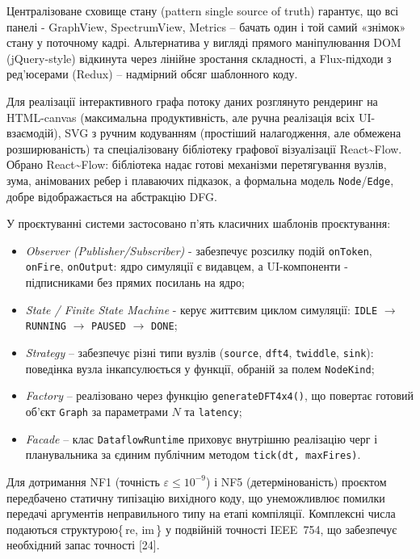 \documentclass[
]{article}
\begin{document}
Централізоване сховище стану (pattern single source of truth) гарантує,
що всі панелі - GraphView, SpectrumView, Metrics -- бачать один і той
самий «знімок» стану у поточному кадрі. Альтернатива у вигляді прямого
маніпулювання DOM (jQuery-style) відкинута через лінійне зростання
складності, а Flux-підходи з ред'юсерами (Redux) -- надмірний обсяг
шаблонного коду.

Для реалізації інтерактивного графа потоку даних розглянуто рендеринг на
HTML-canvas (максимальна продуктивність, але ручна реалізація всіх
UI-взаємодій), SVG з ручним кодуванням (простіший налагодження, але
обмежена розширюваність) та спеціалізовану бібліотеку графової
візуалізації React\textasciitilde Flow. Обрано
React\textasciitilde Flow: бібліотека надає готові механізми
перетягування вузлів, зума, анімованих ребер і плаваючих підказок, а
формальна модель \texttt{Node}/\texttt{Edge}, добре відображається на
абстракцію DFG.

У проєктуванні системи застосовано п'ять класичних шаблонів
проєктування:

\begin{itemize}
\item
  \emph{Observer (Publisher/Subscriber)} - забезпечує розсилку подій
  \texttt{onToken}, \texttt{onFire}, \texttt{onOutput}: ядро симуляції є
  видавцем, а UI-компоненти - підписниками без прямих посилань на ядро;
\item
  \emph{State / Finite State Machine} - керує життєвим циклом симуляції:
  \texttt{IDLE} \(\rightarrow\) \texttt{RUNNING} \(\rightarrow\)
  \texttt{PAUSED} \(\rightarrow\) \texttt{DONE};
\item
  \emph{Strategy} -- забезпечує різні типи вузлів (\texttt{source},
  \texttt{dft4}, \texttt{twiddle}, \texttt{sink}): поведінка вузла
  інкапсулюється у функції, обраній за полем \texttt{NodeKind};
\item
  \emph{Factory} -- реалізовано через функцію \texttt{generateDFT4x4()},
  що повертає готовий об'єкт \texttt{Graph} за параметрами \(N\) та
  \texttt{latency};
\item
  \emph{Facade} -- клас \texttt{DataflowRuntime} приховує внутрішню
  реалізацію черг і планувальника за єдиним публічним методом
  \texttt{tick}\texttt{(}\texttt{dt}\texttt{,\ }\texttt{maxFires}\texttt{)}.
\end{itemize}

Для дотримання NF1 (точність \(\varepsilon \leq 10^{- 9}\)) і NF5
(детермінованість) проєктом передбачено статичну типізацію вихідного
коду, що унеможливлює помилки передачі аргументів неправильного типу на
етапі компіляції. Комплексні числа подаються структурою\{ re, im \} у
подвійній точності IEEE~754, що забезпечує необхідний запас точності
{[}24{]}.
\end{document}
